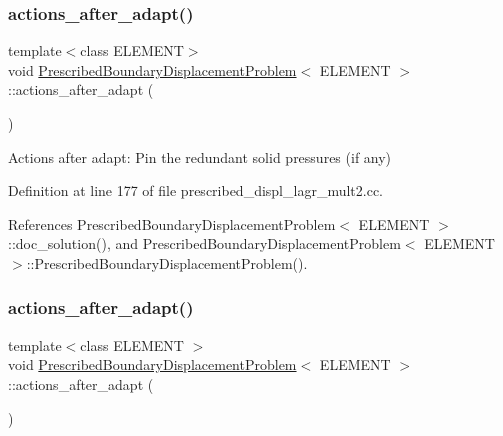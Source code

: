 \subsubsection{\texorpdfstring{actions\+\_\+after\+\_\+adapt()}{actions\_after\_adapt()}\hspace{0.1cm}{\footnotesize\ttfamily [1/3]}}
{\footnotesize\ttfamily template$<$class E\+L\+E\+M\+E\+NT$>$ \\
void \hyperlink{classPrescribedBoundaryDisplacementProblem}{Prescribed\+Boundary\+Displacement\+Problem}$<$ E\+L\+E\+M\+E\+NT $>$\+::actions\+\_\+after\+\_\+adapt (\begin{DoxyParamCaption}{ }\end{DoxyParamCaption})\hspace{0.3cm}{\ttfamily [inline]}}



Actions after adapt\+: Pin the redundant solid pressures (if any) 



Definition at line 177 of file prescribed\+\_\+displ\+\_\+lagr\+\_\+mult2.\+cc.



References Prescribed\+Boundary\+Displacement\+Problem$<$ E\+L\+E\+M\+E\+N\+T $>$\+::doc\+\_\+solution(), and Prescribed\+Boundary\+Displacement\+Problem$<$ E\+L\+E\+M\+E\+N\+T $>$\+::\+Prescribed\+Boundary\+Displacement\+Problem().

\mbox{\label{classPrescribedBoundaryDisplacementProblem_aae7225db18ad5c8429c0eb96fa37b585}} 
\subsubsection{\texorpdfstring{actions\+\_\+after\+\_\+adapt()}{actions\_after\_adapt()}\hspace{0.1cm}{\footnotesize\ttfamily [2/3]}}
{\footnotesize\ttfamily template$<$class E\+L\+E\+M\+E\+NT $>$ \\
void \hyperlink{classPrescribedBoundaryDisplacementProblem}{Prescribed\+Boundary\+Displacement\+Problem}$<$ E\+L\+E\+M\+E\+NT $>$\+::actions\+\_\+after\+\_\+adapt (\begin{DoxyParamCaption}{ }\end{DoxyParamCaption})}



